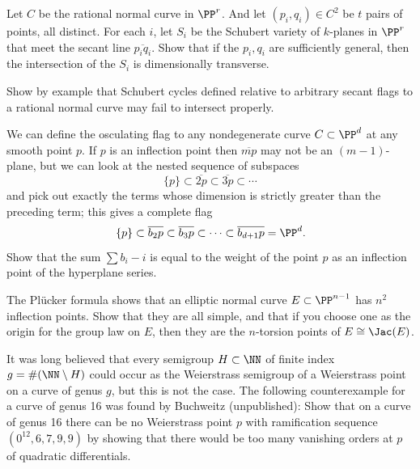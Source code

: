 \begin{exercise}\label{independent secants 0}
Let $C$ be the rational normal curve in $\PP^{r}$. And let $(p_{i},
q_{i})\in  C^{2}$ be $t$ pairs of points, all distinct.
For each $i$, let $S_{i}$ be the Schubert variety of $k$-planes in
$\PP^{r}$ that meet the secant line
$\overline{p_{i}q_{i}}$. Show that if the $p_{i}, q_{i}$ are sufficiently
general, then the intersection
of the $S_{i}$ is dimensionally transverse.
\end{exercise}

\begin{exercise}\label{only general secants}
Show by example that Schubert cycles defined relative to arbitrary secant
flags to a rational normal curve may fail to intersect properly.
\end{exercise}

\begin{exercise}
We can define the osculating flag to any nondegenerate curve $C \subset
\PP^d$ at any smooth point $p$. If $p$ is an inflection point then
$\overline{mp}$ may not be an $(m-1)$-plane, but we can look at the
nested sequence of subspaces
$$
\{p\} \subset \overline{2p} \subset \overline{3p} \subset \cdots
$$
and pick out exactly the terms whose dimension is strictly greater than
the preceding term; this gives a complete flag
$$
\{p\} \subset \overline{b_2p} \subset \overline{b_3p} \subset \dots
\subset \overline{b_{d+1}p} = \PP^d
.
$$
Show that the sum $\sum b_i - i$ is equal to the weight of the point $p$
as an inflection point of the hyperplane series.
\end{exercise}

\begin{exercise}
The Pl\"ucker formula shows that an elliptic normal curve
%
%
$E\subset \PP^{n-1}$ has $n^2$ inflection points. Show that they are
all simple, and that if you choose one as the origin for the group law
on $E$, then
they are the $n$-torsion points of  $E \cong \Jac(E)$.
%
\end{exercise}

\begin{exercise}[Buchweitz]
It was long believed that every semigroup $H \subset \NN$ of finite index
%
$g = \#(\NN \setminus H)$ could occur as the Weierstrass semigroup of
a Weierstrass
point on a curve of genus $g$, but this is not the case. The following
counterexample for a curve of genus 16 was found by Buchweitz
%
(unpublished): Show that on a curve of genus 16 there can be no
Weierstrass point $p$ with ramification sequence
$(0^{12}, 6,7,9,9)$ by showing that there would be too many vanishing
orders at $p$ of quadratic differentials.
 \end{exercise}

